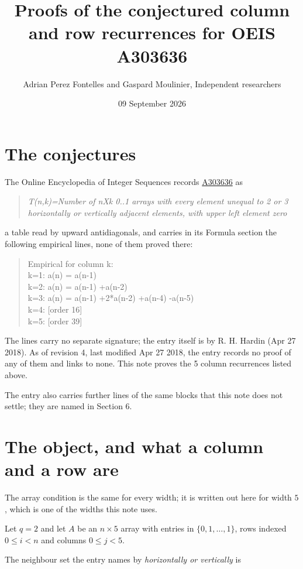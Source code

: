 \documentclass[11pt]{article}
\title{Proofs of the conjectured column and row recurrences for OEIS A303636}
\author{Adrian Perez Fontelles and Gaspard Moulinier, Independent researchers}
\date{09 September 2026}
\theoremstyle{definition}
\begin{document}
\maketitle
\section{The conjectures}

The Online Encyclopedia of Integer Sequences records \href{https://oeis.org/A303636}{A303636} as

\begin{quote}\itshape T(n,k)=Number of nXk 0..1 arrays with every element unequal to 2 or 3 horizontally or vertically adjacent elements, with upper left element zero\end{quote}

a table read by upward antidiagonals, and carries in its Formula section the following empirical lines, none of them proved there:

\begin{quote}\ttfamily Empirical for column k:\\
k=1: a(n) = a(n-1)\\k=2: a(n) = a(n-1) +a(n-2)\\k=3: a(n) = a(n-1) +2*a(n-2) +a(n-4) -a(n-5)\\k=4: [order 16]\\k=5: [order 39]\end{quote}

The lines carry no separate signature; the entry itself is by R. H. Hardin (Apr 27 2018). As of revision 4, last modified Apr 27 2018, the entry records no proof of any of them and links to none. This note proves the 5 column recurrences listed above.

The entry also carries further lines of the same blocks that this note does not settle; they are named in Section 6.

\section{The object, and what a column and a row are}

The array condition is the same for every width; it is written out here for width $5$, which is one of the widths this note uses.

Let $q = 2$ and let $A$ be an $n \times 5$ array with entries in $\{0,1,\dots,1\}$, rows indexed $0 \le i < n$ and columns $0 \le j < 5$.

The neighbour set the entry names by {\itshape horizontally or vertically} is
\end{document}
